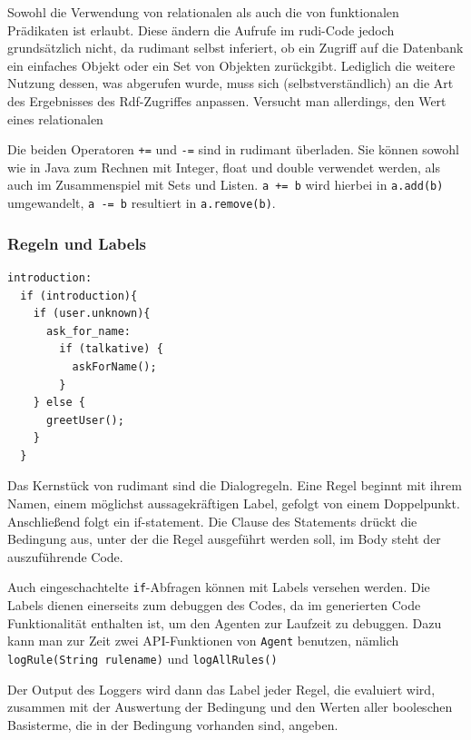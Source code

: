 Sowohl die Verwendung von relationalen als auch die von funktionalen Prädikaten
ist erlaubt. Diese ändern die Aufrufe im rudi-Code jedoch grundsätzlich nicht,
da rudimant selbst inferiert, ob ein Zugriff auf die Datenbank ein einfaches
Objekt oder ein Set von Objekten zurückgibt. Lediglich die weitere Nutzung
dessen, was abgerufen wurde, muss sich (selbstverständlich) an die Art des
Ergebnisses des Rdf-Zugriffes anpassen. Versucht man allerdings, den Wert eines
relationalen

Die beiden Operatoren \texttt{+=} und \texttt{-=} sind in rudimant
überladen. Sie können sowohl wie in Java zum Rechnen mit Integer, float und
double verwendet werden, als auch im Zusammenspiel mit Sets und
Listen. \texttt{a += b} wird hierbei in \texttt{a.add(b)} umgewandelt,
\texttt{a -= b} resultiert in \texttt{a.remove(b)}.

\subsubsection{Regeln und Labels}

\begin{small}
\begin{verbatim}
introduction:
  if (introduction){
    if (user.unknown){
      ask_for_name:
        if (talkative) {
          askForName();
        }
    } else {
      greetUser();
    }
  }
\end{verbatim}
\end{small}

Das Kernstück von rudimant sind die Dialogregeln. Eine Regel beginnt mit ihrem
Namen, einem möglichst aussagekräftigen Label, gefolgt von einem
Doppelpunkt. Anschließend folgt ein if-statement. Die Clause des Statements
drückt die Bedingung aus, unter der die Regel ausgeführt werden soll, im Body
steht der auszuführende Code.

Auch eingeschachtelte \texttt{if}-Abfragen können mit Labels versehen werden.
Die Labels dienen einerseits zum debuggen des Codes, da im generierten Code
Funktionalität enthalten ist, um den Agenten zur Laufzeit zu debuggen. Dazu
kann man zur Zeit zwei API-Funktionen von \texttt{Agent} benutzen, nämlich
\texttt{logRule(String rulename)} und \texttt{logAllRules()}

Der Output des Loggers wird dann das Label jeder Regel, die evaluiert wird,
zusammen mit der Auswertung der Bedingung und den Werten aller booleschen
Basisterme, die in der Bedingung vorhanden sind, angeben.


